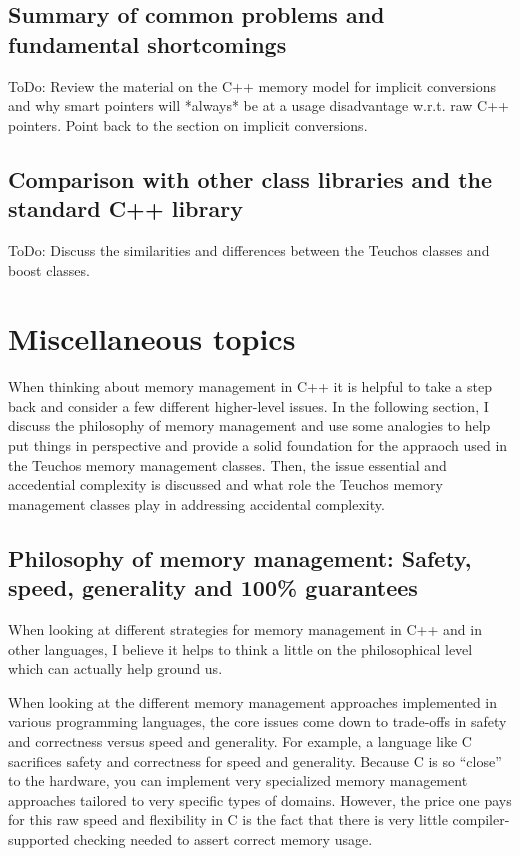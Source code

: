 \documentclass[pdf,ps2pdf,11pt]{SANDreport}
\begin{document}
%
{}\subsection{Summary of common problems and fundamental shortcomings}
%

ToDo: Review the material on the C++ memory model for implicit
conversions and why smart pointers will *always* be at a usage
disadvantage w.r.t. raw C++ pointers.  Point back to the section on
implicit conversions.


%
{}\subsection{Comparison with other class libraries and the standard
C++ library}
%

ToDo: Discuss the similarities and differences between the Teuchos
classes and boost classes.


%
{}\section{Miscellaneous topics}
%

When thinking about memory management in C++ it is helpful to take a
step back and consider a few different higher-level issues.  In the
following section, I discuss the philosophy of memory management and
use some analogies to help put things in perspective and provide a
solid foundation for the appraoch used in the Teuchos memory
management classes.  Then, the issue essential and accedential
complexity is discussed and what role the Teuchos memory management
classes play in addressing accidental complexity.


%
{}\subsection{Philosophy of memory management: Safety, speed,
generality and 100\% guarantees}
\label{sec:phylosophy-of-mem-mng}
%

When looking at different strategies for memory management in C++ and
in other languages, I believe it helps to think a little on the
philosophical level which can actually help ground us.

When looking at the different memory management approaches implemented
in various programming languages, the core issues come down to trade-offs
in safety and correctness versus speed and generality.  For example, a
language like C sacrifices safety and correctness for speed and
generality.  Because C is so ``close'' to the hardware, you can
implement very specialized memory management approaches tailored to
very specific types of domains.  However, the price one pays for this
raw speed and flexibility in C is the fact that there is very little
compiler-supported checking needed to assert correct memory usage.
\end{document}
